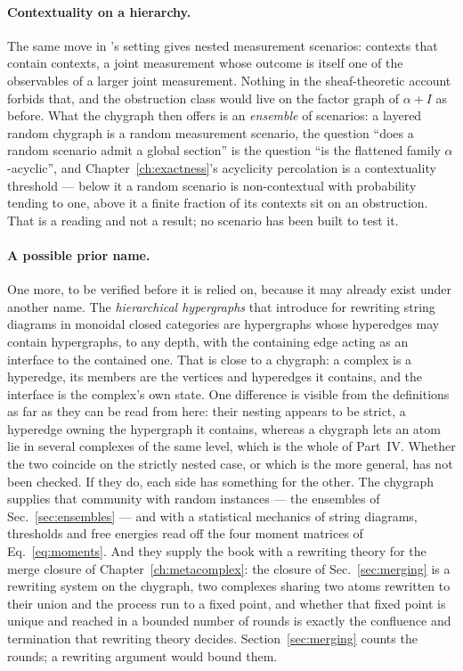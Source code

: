 \paragraph{Contextuality on a hierarchy.} The same move in
\citeauthor{abramsky2011}'s setting gives nested measurement scenarios:
contexts that contain contexts, a joint measurement whose outcome is itself
one of the observables of a larger joint measurement. Nothing in the
sheaf-theoretic account forbids that, and the obstruction class would live
on the factor graph of $\alpha+I$ as before. What the chygraph then offers
is an \emph{ensemble} of scenarios: a layered random chygraph is a random
measurement scenario, the question ``does a random scenario admit a global
section'' is the question ``is the flattened family $\alpha$-acyclic'', and
Chapter~\ref{ch:exactness}'s acyclicity percolation is a contextuality
threshold --- below it a random scenario is non-contextual with probability
tending to one, above it a finite fraction of its contexts sit on an
obstruction. That is a reading and not a result; no scenario has been built
to test it.

\paragraph{A possible prior name.} One more, to be verified before it is
relied on, because it may already exist under another name. The
\emph{hierarchical hypergraphs} that \citet{alvarezpicallo2022} introduce
for rewriting string diagrams in monoidal closed categories are hypergraphs
whose hyperedges may contain hypergraphs, to any depth, with the containing
edge acting as an interface to the contained one. That is close to a
chygraph: a complex is a hyperedge, its members are the vertices and
hyperedges it contains, and the interface is the complex's own state. One
difference is visible from the definitions as far as they can be read from
here: their nesting appears to be strict, a hyperedge owning the hypergraph
it contains, whereas a chygraph lets an atom lie in several complexes of
the same level, which is the whole of Part~IV. Whether the two coincide on
the strictly nested case, or which is the more general, has not been
checked. If they do, each side has something for the other.
The chygraph supplies that community with random instances --- the
ensembles of Sec.~\ref{sec:ensembles} --- and with a statistical mechanics
of string diagrams, thresholds and free energies read off the four moment
matrices of Eq.~\eqref{eq:moments}. And they supply the book with a
rewriting theory for the merge closure of Chapter~\ref{ch:metacomplex}: the
closure of Sec.~\ref{sec:merging} is a rewriting system on the chygraph,
two complexes sharing two atoms rewritten to their union and the process run
to a fixed point, and whether that fixed point is unique and reached in a
bounded number of rounds is exactly the confluence and termination that
rewriting theory decides. Section~\ref{sec:merging} counts the rounds; a rewriting argument would
bound them.

